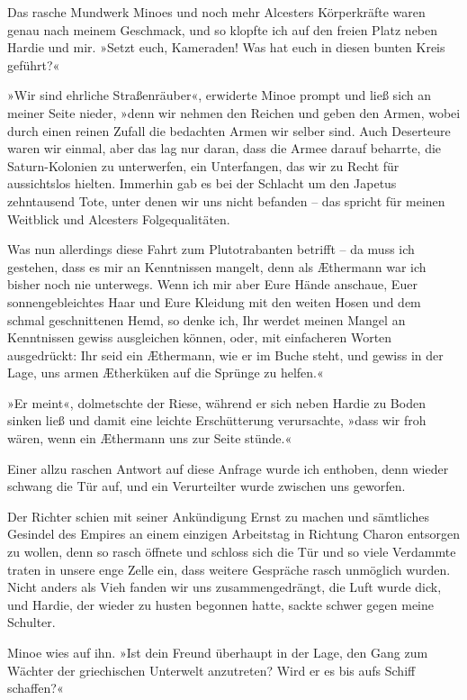 Das rasche Mundwerk Minoes und noch mehr Alcesters Körperkräfte
waren genau nach meinem Geschmack, und so klopfte ich auf den
freien Platz neben Hardie und mir. »Setzt euch, Kameraden! Was hat
euch in diesen bunten Kreis geführt?«

»Wir sind ehrliche Straßenräuber«, erwiderte Minoe prompt und ließ
sich an meiner Seite nieder, »denn wir nehmen den Reichen und geben
den Armen, wobei durch einen reinen Zufall die bedachten Armen wir
selber sind. Auch Deserteure waren wir einmal, aber das lag nur
daran, dass die Armee darauf beharrte, die Saturn-Kolonien zu
unterwerfen, ein Unterfangen, das wir zu Recht für aussichtslos
hielten. Immerhin gab es bei der Schlacht um den Japetus
zehntausend Tote, unter denen wir uns nicht befanden – das spricht
für meinen Weitblick und Alcesters Folgequalitäten.

Was nun allerdings diese Fahrt zum Plutotrabanten betrifft – da
muss ich gestehen, dass es mir an Kenntnissen mangelt, denn als
Æthermann war ich bisher noch nie unterwegs. Wenn ich mir aber Eure
Hände anschaue, Euer sonnengebleichtes Haar und Eure Kleidung mit
den weiten Hosen und dem schmal geschnittenen Hemd, so denke ich,
Ihr werdet meinen Mangel an Kenntnissen gewiss ausgleichen können,
oder, mit einfacheren Worten ausgedrückt: Ihr seid ein Æthermann,
wie er im Buche steht, und gewiss in der Lage, uns armen Ætherküken
auf die Sprünge zu helfen.«

»Er meint«, dolmetschte der Riese, während er sich neben Hardie zu
Boden sinken ließ und damit eine leichte Erschütterung verursachte,
»dass wir froh wären, wenn ein Æthermann uns zur Seite stünde.«

Einer allzu raschen Antwort auf diese Anfrage wurde ich enthoben,
denn wieder schwang die Tür auf, und ein Verurteilter wurde
zwischen uns geworfen.

Der Richter schien mit seiner Ankündigung Ernst zu machen und
sämtliches Gesindel des Empires an einem einzigen Arbeitstag in
Richtung Charon entsorgen zu wollen, denn so rasch öffnete und
schloss sich die Tür und so viele Verdammte traten in unsere enge
Zelle ein, dass weitere Gespräche rasch unmöglich wurden. Nicht
anders als Vieh fanden wir uns zusammengedrängt, die Luft wurde
dick, und Hardie, der wieder zu husten begonnen hatte, sackte
schwer gegen meine Schulter.

\bigpar

Minoe wies auf ihn. »Ist dein Freund überhaupt in der Lage, den
Gang zum Wächter der griechischen Unterwelt anzutreten? Wird er es
bis aufs Schiff schaffen?«


